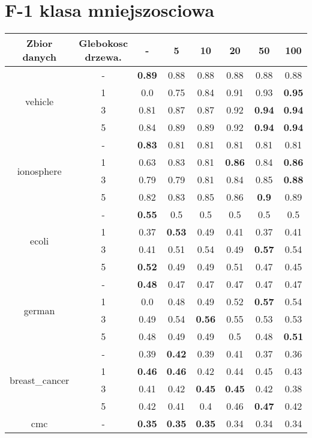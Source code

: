 \documentclass{article}%
\begin{document}
\section*{F{-}1 klasa mniejszosciowa}%
\begin{longtable}{c|c|cccccc}%
\hline%
Zbior danych&Glebokosc drzewa.&{-}&5&10&20&50&100\\%
\hline%
\multirow{4}{*}{vehicle}&{-}&\textbf{0.89}&0.88&0.88&0.88&0.88&0.88\\%
\cline{2%
-%
8}%
&1&0.0&0.75&0.84&0.91&0.93&\textbf{0.95}\\%
\cline{2%
-%
8}%
&3&0.81&0.87&0.87&0.92&\textbf{0.94}&\textbf{0.94}\\%
\cline{2%
-%
8}%
&5&0.84&0.89&0.89&0.92&\textbf{0.94}&\textbf{0.94}\\%
\hline%
\multirow{4}{*}{ionosphere}&{-}&\textbf{0.83}&0.81&0.81&0.81&0.81&0.81\\%
\cline{2%
-%
8}%
&1&0.63&0.83&0.81&\textbf{0.86}&0.84&\textbf{0.86}\\%
\cline{2%
-%
8}%
&3&0.79&0.79&0.81&0.84&0.85&\textbf{0.88}\\%
\cline{2%
-%
8}%
&5&0.82&0.83&0.85&0.86&\textbf{0.9}&0.89\\%
\hline%
\multirow{4}{*}{ecoli}&{-}&\textbf{0.55}&0.5&0.5&0.5&0.5&0.5\\%
\cline{2%
-%
8}%
&1&0.37&\textbf{0.53}&0.49&0.41&0.37&0.41\\%
\cline{2%
-%
8}%
&3&0.41&0.51&0.54&0.49&\textbf{0.57}&0.54\\%
\cline{2%
-%
8}%
&5&\textbf{0.52}&0.49&0.49&0.51&0.47&0.45\\%
\hline%
\multirow{4}{*}{german}&{-}&\textbf{0.48}&0.47&0.47&0.47&0.47&0.47\\%
\cline{2%
-%
8}%
&1&0.0&0.48&0.49&0.52&\textbf{0.57}&0.54\\%
\cline{2%
-%
8}%
&3&0.49&0.54&\textbf{0.56}&0.55&0.53&0.53\\%
\cline{2%
-%
8}%
&5&0.48&0.49&0.49&0.5&0.48&\textbf{0.51}\\%
\hline%
\multirow{4}{*}{breast\_cancer}&{-}&0.39&\textbf{0.42}&0.39&0.41&0.37&0.36\\%
\cline{2%
-%
8}%
&1&\textbf{0.46}&\textbf{0.46}&0.42&0.44&0.45&0.43\\%
\cline{2%
-%
8}%
&3&0.41&0.42&\textbf{0.45}&\textbf{0.45}&0.42&0.38\\%
\cline{2%
-%
8}%
&5&0.42&0.41&0.4&0.46&\textbf{0.47}&0.42\\%
\hline%
\multirow{4}{*}{cmc}&{-}&\textbf{0.35}&\textbf{0.35}&\textbf{0.35}&0.34&0.34&0.34\\%

\end{longtable}
\end{document}
